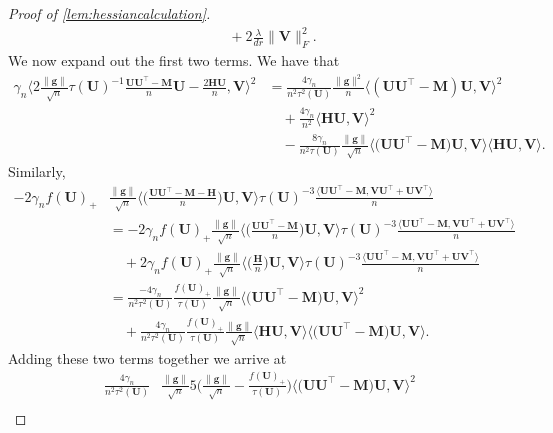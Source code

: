 \documentclass[10pt]{article}
\renewcommand{\t}{^{\top}}
\newcommand{\inv}{^{-1}}
\theoremstyle{definition}
\begin{document}
\begin{proof}[Proof of \cref{lem:hessiancalculation}]
\begin{align}
    &\quad + 2 \frac{\lambda}{dr} \| \bm{V} \|_F^2.
\end{align}
We  now expand out the first two terms.  We have that
\begin{align}
    \gamma_n \bigg\langle 2\frac{\|\bm{g}\|}{\sqrt{n}} \tau(\bm{U})\inv \frac{\bm{UU}\t - \bm{M}}{n} \bm{U} - \frac{2\bm{HU}}{n}, \bm{V} \bigg\rangle^2 &= 
\frac{4 \gamma_n }{n^2\tau^{2}(\bm{U})}\frac{\|\bm{g}\|^2}{n} \bigg \langle (\bm{UU}\t - \bm{M} ) \bm{U}, \bm{V} \bigg \rangle^2 \\
&\quad + \frac{4 \gamma_n }{n^2} \bigg \langle \bm{H} \bm{U}, \bm{V} \bigg \rangle^2 \\
&\quad - \frac{8 \gamma_n }{n^2\tau(\bm{U})} \frac{\|\bm{g}\|}{\sqrt{n}} \bigg\langle \big(\bm{UU}\t - \bm{M} \big) \bm{U} , \bm{V} \bigg \rangle \bigg \langle \bm{HU}, \bm{V} \bigg \rangle.
\end{align}
Similarly,
\begin{align}
     - 2\gamma_n f(\bm{U})_+  &\frac{\|\bm{g}\|}{\sqrt{n}} \bigg\langle \bigg(\frac{ \bm{UU}\t  - \bm{M}- \bm{H}}{n}  \bigg)  \bm{U}  , \bm{V} \bigg \rangle \tau(\bm{U})^{-3} \frac{\langle \bm{UU\t - M}, \bm{VU}\t + \bm{UV}\t \rangle}{n} \\ 
     &=  - 2\gamma_n f(\bm{U})_+  \frac{\|\bm{g}\|}{\sqrt{n}} \bigg\langle \bigg(\frac{ \bm{UU}\t  - \bm{M}}{n}  \bigg)  \bm{U}  , \bm{V} \bigg \rangle \tau(\bm{U})^{-3} \frac{\langle \bm{UU\t - M}, \bm{VU}\t + \bm{UV}\t \rangle}{n} \\ 
     &\quad + 2\gamma_n f(\bm{U})_+  \frac{\|\bm{g}\|}{\sqrt{n}} \bigg\langle \bigg(\frac{  \bm{H}}{n}  \bigg)  \bm{U}  , \bm{V} \bigg \rangle \tau(\bm{U})^{-3} \frac{\langle \bm{UU\t - M}, \bm{VU}\t + \bm{UV}\t \rangle}{n} \\ 
     &= \frac{-4 \gamma_n}{n^2 \tau^2(\bm{U})} \frac{f(\bm{U})_+}{\tau(\bm{U})} \frac{\|\bm{g}\|}{\sqrt{n}} \bigg \langle \big( \bm{UU}\t - \bm{M} \big) \bm{U} , \bm{V} \bigg \rangle^2 \\
     &\quad + \frac{4 \gamma_n}{n^2 \tau^2(\bm{U})} \frac{f(\bm{U})_+}{\tau(\bm{U})} \frac{\|\bm{g}\|}{\sqrt{n}} \bigg\langle \bm{HU}, \bm{V} \bigg \rangle \bigg\langle \big( \bm{UU}\t - \bm{M} \big) \bm{U}, \bm{V} \bigg \rangle.
\end{align}
Adding these two terms together we arrive at
\begin{align}
    \frac{4 \gamma_n}{n^2 \tau^2(\bm{U})} &\frac{\|\bm{g}\|}{\sqrt{n}} 5\bigg( \frac{\|\bm{g}\|}{\sqrt{n}} - \frac{f(\bm{U})_+}{\tau(\bm{U})} \bigg) \bigg \langle \big( \bm{UU}\t - \bm{M}\big) \bm{U}, \bm{V} \bigg \rangle^2 \\

\end{align}
\end{proof}
\end{document}

